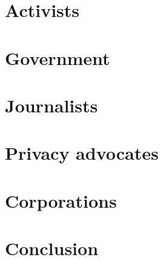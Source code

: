 

\section{Activists}


\section{Government}


\section{Journalists}


\section{Privacy advocates}


\section{Corporations}


\section{Conclusion}
